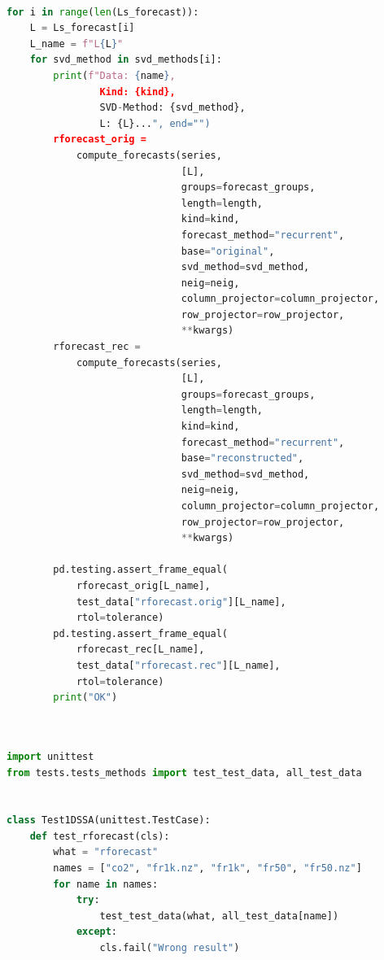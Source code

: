 \documentclass[specialist,
			   substylefile = spbu_report.rtx,
			   subf,href,colorlinks=true, 12pt]{disser}
\begin{document}
\begin{lstlisting}[language=Python, caption=Перебор параметров рекуррентного прогнозирования и проверка результатов на правильность.]
	
for i in range(len(Ls_forecast)):
    L = Ls_forecast[i]
    L_name = f"L{L}"
    for svd_method in svd_methods[i]:
        print(f"Data: {name},
                Kind: {kind}, 
                SVD-Method: {svd_method}, 
                L: {L}...", end="")
        rforecast_orig = 
            compute_forecasts(series,
                              [L], 
                              groups=forecast_groups,
                              length=length,
                              kind=kind,
                              forecast_method="recurrent", 
                              base="original",
                              svd_method=svd_method, 
                              neig=neig,
                              column_projector=column_projector, 
                              row_projector=row_projector,
                              **kwargs)
        rforecast_rec = 
            compute_forecasts(series,
                              [L], 
                              groups=forecast_groups, 
                              length=length,
                              kind=kind, 
                              forecast_method="recurrent",
                              base="reconstructed",
                              svd_method=svd_method, 
                              neig=neig,
                              column_projector=column_projector, 
                              row_projector=row_projector,
                              **kwargs)

        pd.testing.assert_frame_equal(
            rforecast_orig[L_name],
            test_data["rforecast.orig"][L_name],
            rtol=tolerance)
        pd.testing.assert_frame_equal(
            rforecast_rec[L_name], 
            test_data["rforecast.rec"][L_name],
            rtol=tolerance)
        print("OK")
	
\end{lstlisting}

\begin{lstlisting}[language=Python, caption=Запуск тестов правильности рекуррентного прогнозирования временного ряда и обработка исключений.]
	
import unittest
from tests.tests_methods import test_test_data, all_test_data


class Test1DSSA(unittest.TestCase):
    def test_rforecast(cls):
        what = "rforecast"
        names = ["co2", "fr1k.nz", "fr1k", "fr50", "fr50.nz"]
        for name in names:
            try:
                test_test_data(what, all_test_data[name])
            except:
                cls.fail("Wrong result")
	
\end{lstlisting}
\end{document}
